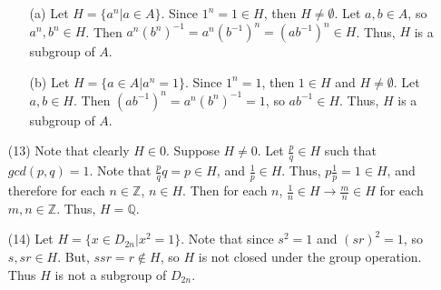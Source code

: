 \documentclass[12pt]{article}
\begin{document}
\begin{itemize}
\begin{itemize}
\item[(a)]
Let $H = \{ a^n | a \in A \}$. Since $1^n = 1 \in H$, then $H \neq \emptyset$. Let $a, b \in A$, so $a^n, b^n \in H$. Then $a^n(b^n)^{-1} = a^n(b^{-1})^n = (ab^{-1})^n \in H$. Thus, $H$ is a subgroup of $A$.
\item[(b)]
Let $H = \{ a \in A | a^n = 1 \}$. Since $1^n = 1$, then $1 \in H$ and $H \neq \emptyset$. Let $a, b \in H$. Then $(ab^{-1})^n = a^n(b^{n})^{-1} = 1$, so $ab^{-1} \in H$.  Thus, $H$ is a subgroup of $A$.
\end{itemize}
\item[(13)] 
Note that clearly $H \in 0$. Suppose $H \neq 0$. Let $\frac{p}{q} \in H$ such that $gcd(p, q) = 1$. Note that $\frac{p}{q}q = p \in H$, and $\frac{1}{p} \in H$. Thus, $p\frac{1}{p} = 1 \in H$, and therefore for each $n \in \mathbb{Z}$, $n \in H$. Then for each $n$, $\frac{1}{n} \in H \rightarrow \frac{m}{n} \in H$ for each $m, n \in \mathbb{Z}$. Thus, $H = \mathbb{Q}$.
\item[(14)]
Let $H = \{ x \in D_{2n} | x^2 = 1 \}$. Note that since $s^2 = 1$ and $(sr)^2 = 1$, so $s, sr \in H$. But, $ssr = r \not \in H$, so $H$ is not closed under the group operation. Thus $H$ is not a subgroup of $D_{2n}$.
\end{itemize}
\end{document}
